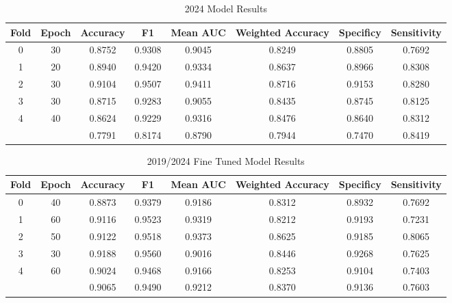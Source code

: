 \documentclass{article}
\begin{document}
\begin{table}[t]
    \caption{2024 Model Results}
    \label{2024table}
    \vskip 0.15in
    \begin{center}
    \begin{small}
    \begin{sc}
    \begin{tabular*}{\linewidth}{@{\extracolsep{\fill}} cccccccc}
    \toprule
    Fold & Epoch & Accuracy & F1 & Mean AUC & Weighted Accuracy & Specificy & Sensitivity \\
    \midrule
    0 & 30 & 0.8752 & 0.9308 & 0.9045 & 0.8249 & 0.8805 & 0.7692 \\
    1 & 20 & 0.8940 & 0.9420 & 0.9334 & 0.8637 & 0.8966 & 0.8308 \\
    2 & 30 & 0.9104 & 0.9507 & 0.9411 & 0.8716 & 0.9153 & 0.8280 \\
    3 & 30 & 0.8715 & 0.9283 & 0.9055 & 0.8435 & 0.8745 & 0.8125 \\
    4 & 40 & 0.8624 & 0.9229 & 0.9316 & 0.8476 & 0.8640 & 0.8312 \\
    \midrule
      &    & 0.7791 & 0.8174 & 0.8790 & 0.7944 & 0.7470 & 0.8419 \\
    \bottomrule
    \end{tabular*}
    \end{sc}
    \end{small}
    \end{center}
    \vskip -0.1in
\end{table}

\begin{table}[t]
    \caption{2019/2024 Fine Tuned Model Results}
    \label{20192024table}
    \vskip 0.15in
    \begin{center}
    \begin{small}
    \begin{sc}
    \begin{tabular*}{\linewidth}{@{\extracolsep{\fill}} cccccccc}
    \toprule
    Fold & Epoch & Accuracy & F1 & Mean AUC & Weighted Accuracy & Specificy & Sensitivity \\
    \midrule
    0 & 40 & 0.8873 & 0.9379 & 0.9186 & 0.8312 & 0.8932 & 0.7692 \\
    1 & 60 & 0.9116 & 0.9523 & 0.9319 & 0.8212 & 0.9193 & 0.7231 \\
    2 & 50 & 0.9122 & 0.9518 & 0.9373 & 0.8625 & 0.9185 & 0.8065 \\
    3 & 30 & 0.9188 & 0.9560 & 0.9016 & 0.8446 & 0.9268 & 0.7625 \\
    4 & 60 & 0.9024 & 0.9468 & 0.9166 & 0.8253 & 0.9104 & 0.7403 \\
    \midrule
      &    & 0.9065 & 0.9490 & 0.9212 & 0.8370 & 0.9136 & 0.7603 \\
    \bottomrule
    \end{tabular*}
    \end{sc}
    \end{small}
    \end{center}
    \vskip -0.1in
\end{table}
\end{document}
